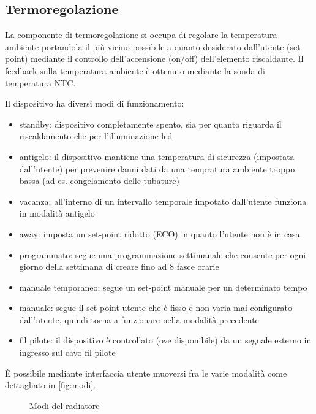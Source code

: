 \documentclass[12pt,a4paper,twoside,titlepage]{book}
\begin{document}
\subsection{Termoregolazione}

La componente di termoregolazione si occupa di regolare la temperatura ambiente portandola
il più vicino possibile a quanto desiderato dall'utente (set-point) mediante
il controllo dell'accensione (on/off) dell'elemento riscaldante. Il feedback sulla
temperatura ambiente è ottenuto mediante la sonda di temperatura NTC.

Il dispositivo ha diversi modi di funzionamento:
\begin{itemize}
    \item standby: dispositivo completamente spento, sia per quanto riguarda il riscaldamento
        che per l'illuminazione \acrshort{led}
    \item antigelo: il dispositivo mantiene una temperatura di sicurezza (impostata dall'utente)
        per prevenire danni dati da una tempratura ambiente troppo bassa (ad es. congelamento delle tubature)
    \item vacanza: all'interno di un intervallo temporale impotato dall'utente funziona
        in modalità antigelo
    \item away: imposta un set-point ridotto (ECO) in quanto l'utente non è in casa
    \item programmato: segue una programmazione settimanale che consente per ogni
        giorno della settimana di creare fino ad 8 fasce orarie
    \item manuale temporaneo: segue un set-point manuale per un determinato tempo
    \item manuale: segue il set-point utente che è fisso e non varia mai
        configurato dall'utente, quindi torna a funzionare nella modalità precedente
    \item fil pilote: il dispositivo è controllato (ove disponibile) da un segnale
        esterno in ingresso sul cavo fil pilote
\end{itemize}

È possibile mediante interfaccia utente muoversi fra le varie modalità come dettagliato
in \autoref{fig:modi}.

\begin{figure}[ht]
    \centering
    \caption{Modi del radiatore}
    \label{fig:modi}
\end{figure}
\end{document}
